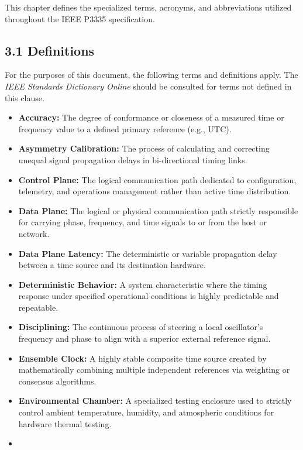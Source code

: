 This chapter defines the specialized terms, acronyms, and abbreviations
utilized throughout the IEEE P3335 specification.

\subsection{3.1 Definitions}\label{definitions}

For the purposes of this document, the following terms and definitions
apply. The \emph{IEEE Standards Dictionary Online} should be consulted
for terms not defined in this clause.

\begin{itemize}
\tightlist
\item
  \textbf{Accuracy:} The degree of conformance or closeness of a
  measured time or frequency value to a defined primary reference (e.g.,
  UTC).
\item
  \textbf{Asymmetry Calibration:} The process of calculating and
  correcting unequal signal propagation delays in bi-directional timing
  links.
\item
  \textbf{Control Plane:} The logical communication path dedicated to
  configuration, telemetry, and operations management rather than active
  time distribution.
\item
  \textbf{Data Plane:} The logical or physical communication path
  strictly responsible for carrying phase, frequency, and time signals
  to or from the host or network.
\item
  \textbf{Data Plane Latency:} The deterministic or variable propagation
  delay between a time source and its destination hardware.
\item
  \textbf{Deterministic Behavior:} A system characteristic where the
  timing response under specified operational conditions is highly
  predictable and repeatable.
\item
  \textbf{Disciplining:} The continuous process of steering a local
  oscillator's frequency and phase to align with a superior external
  reference signal.
\item
  \textbf{Ensemble Clock:} A highly stable composite time source created
  by mathematically combining multiple independent references via
  weighting or consensus algorithms.
\item
  \textbf{Environmental Chamber:} A specialized testing enclosure used
  to strictly control ambient temperature, humidity, and atmospheric
  conditions for hardware thermal testing.
\item

\end{itemize}
